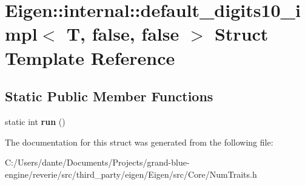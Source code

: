 \hypertarget{struct_eigen_1_1internal_1_1default__digits10__impl_3_01_t_00_01false_00_01false_01_4}{}\section{Eigen\+::internal\+::default\+\_\+digits10\+\_\+impl$<$ T, false, false $>$ Struct Template Reference}
\label{struct_eigen_1_1internal_1_1default__digits10__impl_3_01_t_00_01false_00_01false_01_4}
\subsection*{Static Public Member Functions}
\begin{DoxyCompactItemize}
\item 
\mbox{\label{struct_eigen_1_1internal_1_1default__digits10__impl_3_01_t_00_01false_00_01false_01_4_a521064304069c0b00be0bf9b6ee855a8}} 
static int {\bfseries run} ()
\end{DoxyCompactItemize}


The documentation for this struct was generated from the following file\+:\begin{DoxyCompactItemize}
\item 
C\+:/\+Users/dante/\+Documents/\+Projects/grand-\/blue-\/engine/reverie/src/third\+\_\+party/eigen/\+Eigen/src/\+Core/Num\+Traits.\+h\end{DoxyCompactItemize}
